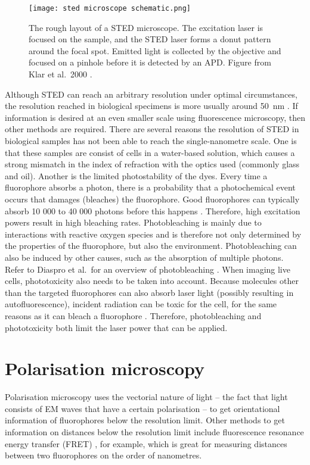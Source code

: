 \begin{figure}
	\centering
	\texttt{[image: sted microscope schematic.png]}
	\caption{
		The rough layout of a STED microscope. The excitation laser is focused on the sample, and the STED laser forms a donut pattern around the focal spot. Emitted light is collected by the objective and focused on a pinhole before it is detected by an APD. Figure from Klar et al.~2000 \cite{Klar2000}.
	}
	\label{fig:sted microscope}
\end{figure}

Although STED can reach an arbitrary resolution under optimal circumstances, the resolution reached in biological specimens is more usually around 50~nm \cite{Wildanger2012,Muller2012}. If information is desired at an even smaller scale using fluorescence microscopy, then other methods are required.
There are several reasons the resolution of STED in biological samples has not been able to reach the single-nanometre scale. One is that these samples are consist of cells in a water-based solution, which causes a strong mismatch in the index of refraction with the optics used (commonly glass and oil). Another is the limited photostability of the dyes. Every time a fluorophore absorbs a photon, there is a probability that a photochemical event occurs that damages (bleaches) the fluorophore. Good fluorophores can typically absorb 10 000 to 40 000 photons before this happens \cite{Lichtman2005}. Therefore, high excitation powers result in high bleaching rates. Photobleaching is mainly due to interactions with reactive oxygen species and is therefore not only determined by the properties of the fluorophore, but also the environment. Photobleaching can also be induced by other causes, such as the absorption of multiple photons. Refer to Diaspro et al.~for an overview of photobleaching \cite{Diaspro2006}. When imaging live cells, phototoxicity also needs to be taken into account. Because molecules other than the targeted fluorophores can also absorb laser light (possibly resulting in autofluorescence), incident radiation can be toxic for the cell, for the same reasons as it can bleach a fluorophore \cite{Lichtman2005}. Therefore, photobleaching and phototoxicity both limit the laser power that can be applied.


\section{Polarisation microscopy}

Polarisation microscopy uses the vectorial nature of light -- the fact that light consists of EM waves that have a certain polarisation -- to get orientational information of fluorophores below the resolution limit. Other methods to get information on distances below the resolution limit  include fluorescence resonance energy transfer (FRET) \cite{Lerner2021}, for example, which is great for measuring distances between two fluorophores on the order of nanometres.


